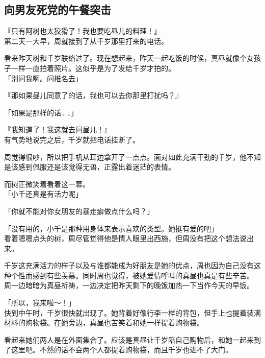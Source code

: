 \subsection{向男友死党的午餐突击}

『只有阿树也太狡猾了！我也要吃昼儿的料理！』\\

第二天一大早，周就接到了从千岁那里打来的电话。

看来昨天树和千岁联络过了。现在想起来，昨天一起吃饭的时候，真昼就像个女孩子一样一直拍着照片。这似乎是为了发给千岁才拍的。\\

「别问我啊。问椎名去」

『那如果昼儿同意了的话，我也可以去你那里打扰吗？』

「如果是那样的话……」

『我知道了！我这就去问昼儿！』\\

有气势地说完之后，千岁就把电话挂断了。

周觉得很吵，所以把手机从耳边拿开了一点点。面对如此充满干劲的千岁，他不知是该感到佩服还是该觉得无语，正露出着迷茫的表情。

而树正微笑着看着这一幕。\\

「小千还真是有活力呢」

「你就不能对你女朋友的暴走癖做点什么吗？」

「没有用的，小千是那种用身体来表示喜欢的类型。她挺有爱的吧」\\

看着嗯嗯点头的树，周尽管觉得他是情人眼里出西施，但周没有把这个想法说出来。

千岁这充满活力的样子以及与谁都能成为好朋友是她的优点，周也因为自己没有这种个性而感到有些羡慕。同时周也觉得，被她爱情呼叫的真昼也真是有些辛苦。\\

周一边暗暗为真昼祈祷，一边决定把昨天剩下的晚饭加热一下当作今天的早饭。\\

\vspace{2\baselineskip}

「所以，我来啦～！」\\

快到中午时，千岁很快就出现了。她背着好像行李一样的背包，但手上也提着装满材料的购物袋。在她旁边，真昼也苦笑着和她一样提着购物袋。

看起来她们两人是在外面集合了。应该是真昼让千岁陪自己购物后，和她一起来到了这里吧。不然的话不会两个人都提着购物袋，而且千岁也进不了大门。\\

